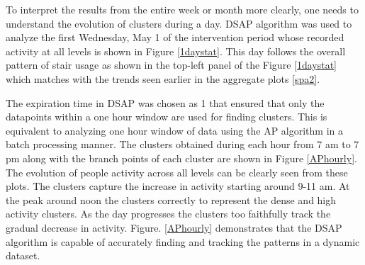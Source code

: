To interpret the results from the entire week or month more clearly, one needs to understand the evolution of clusters during a day. DSAP algorithm was used to analyze the first Wednesday, May 1 of the intervention period whose recorded activity at all levels is shown in Figure \ref{1daystat}. This day follows the overall pattern of stair usage as shown in the top-left panel of the Figure \ref{1daystat} which matches with the trends seen earlier in the aggregate plots \ref{spa2}.

The expiration time in DSAP was chosen as 1 that ensured that only the datapoints within a one hour window are used for finding clusters. This is equivalent to analyzing one hour window of data using the AP algorithm in a batch processing manner. The clusters obtained during each hour from 7 am to 7 pm along with the branch points of each cluster are shown in Figure \ref{APhourly}. The evolution of people activity across all levels can be clearly seen from these plots. The clusters capture the increase in activity starting around 9-11 am. At the peak around noon the clusters correctly to represent the dense and high activity clusters. As the day progresses the clusters too faithfully track the gradual decrease in activity. Figure. \ref{APhourly} demonstrates that the DSAP algorithm is capable of accurately finding and tracking the patterns in a dynamic dataset.

